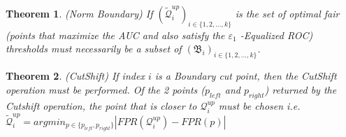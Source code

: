 \documentclass{article}
\newtheorem{theorem}{Theorem}[section]
\newcommand{\ourdef}{-Equalized ROC}
\begin{document}
\begin{theorem}(Norm Boundary)
    If $(\widetilde{\mathcal{Q}}_i^{up})_{i\in \{1 ,2 , \hdots , k\}}$ is the set of optimal fair (points that maximize the AUC and also satisfy the $\varepsilon_1$ \ourdef) thresholds must necessarily be a subset of $(\mathfrak{B}_i)_{i\in \{1 ,2 , \hdots , k\}}$. 
\end{theorem}


\begin{theorem}(CutShift)
    If index $i$ is a Boundary cut point, then the CutShift operation must be performed. Of the 2 points ($p_{left}$ and $p_{right}$) returned by the Cutshift operation, the point that is closer to $\mathcal{Q}_{i}^{up}$ must be chosen i.e.$\mathcal{\widetilde{Q}}_i^{up} = argmin_{p \in \{ p_{left} , p_{right}\}} |FPR(\mathcal{Q}_i^{up}) - FPR(p)|$
\end{theorem}
\end{document}
